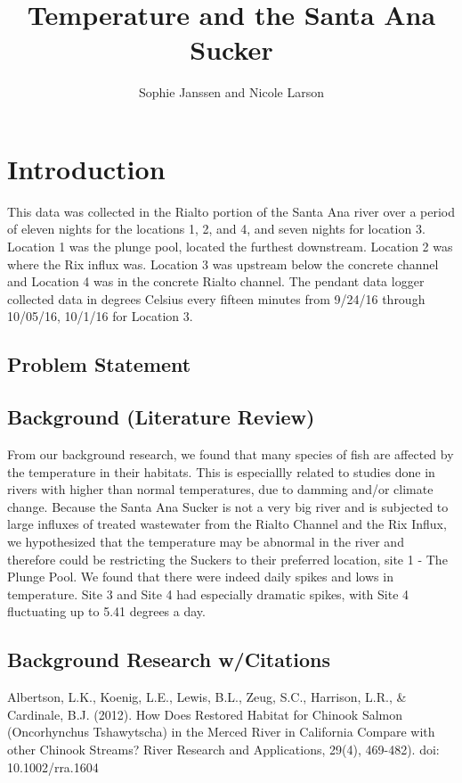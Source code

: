 \documentclass{article}\usepackage[]{graphicx}\usepackage[]{color}
\title{Temperature and the Santa Ana Sucker}
\author{Sophie Janssen and Nicole Larson}
\begin{document}

\maketitle

\newpage
\tableofcontents
\newpage

\section{Introduction}
This data was collected in the Rialto portion of the Santa Ana river over a period of eleven nights for the locations 1, 2, and 4, and seven nights for location 3. Location 1 was the plunge pool, located the furthest downstream. Location 2 was where the Rix influx was. Location 3 was upstream below the concrete channel and Location 4 was in the concrete Rialto channel. The pendant data logger collected data in degrees Celsius every fifteen minutes from 9/24/16 through 10/05/16, 10/1/16 for Location 3. 

\subsection{Problem Statement}


\subsection{Background (Literature Review)}
From our background research, we found that many species of fish are affected by the temperature in their habitats. This is especiallly related to studies done in rivers with higher than normal temperatures, due to damming and/or climate change. Because the Santa Ana Sucker is not a very big river and is subjected to large influxes of treated wastewater from the Rialto Channel and the Rix Influx, we hypothesized that the temperature may be abnormal in the river and therefore could be restricting the Suckers to their preferred location, site 1 - The Plunge Pool. We found that there were indeed daily spikes and lows in temperature. Site 3 and Site 4 had especially dramatic spikes, with Site 4 fluctuating up to 5.41 degrees a day.
 
\subsection{Background Research w/Citations} 

Albertson, L.K., Koenig, L.E., Lewis, B.L., Zeug, S.C., Harrison, L.R., \& Cardinale, B.J. (2012). How Does Restored Habitat for Chinook Salmon (Oncorhynchus Tshawytscha) in the Merced River in California Compare with other Chinook Streams? River Research and Applications, 29(4), 469-482). doi: 10.1002/rra.1604
\end{document}
